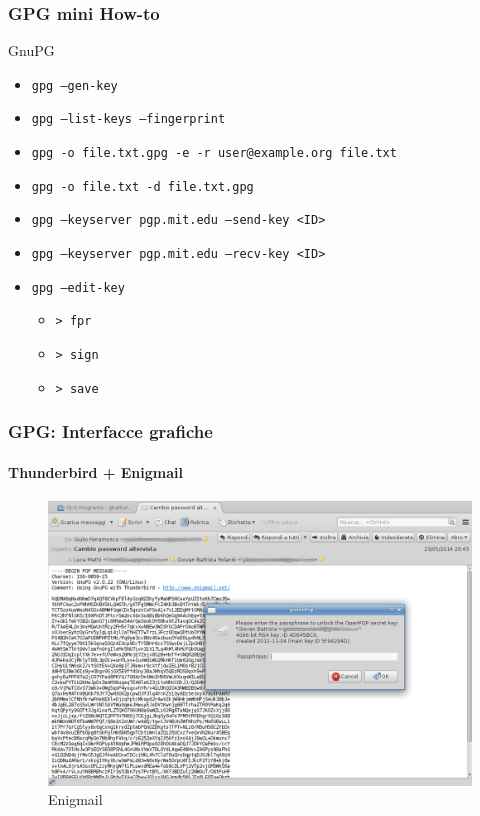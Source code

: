 \documentclass{beamer}
\begin{document}
\begin{frame}[fragile]
  \frametitle{GPG mini How-to}

  \begin{block}{GnuPG}
    \begin{itemize}[<+->]
      \item \tt gpg --gen-key
      \item \tt gpg --list-keys --fingerprint
      \item \tt gpg -o file.txt.gpg -e -r user@example.org file.txt
      \item \tt gpg -o file.txt -d file.txt.gpg
      \item \tt gpg --keyserver pgp.mit.edu --send-key <ID>
      \item \tt gpg --keyserver pgp.mit.edu --recv-key <ID>
      \item \tt gpg --edit-key
      \begin{itemize}
        \item \tt > fpr
        \item \tt > sign
        \item \tt > save
      \end{itemize}
    \end{itemize}
  \end{block}
\end{frame}

\begin{frame}
  \frametitle{GPG: Interfacce grafiche}
  \framesubtitle{Thunderbird + Enigmail}

  \begin{figure}
    \centering
    \includegraphics[width=.7\linewidth]{img/enigmail.png}
    \caption{Enigmail}
    \label{fig:enigmail0}
  \end{figure}
\end{frame}
\end{document}
